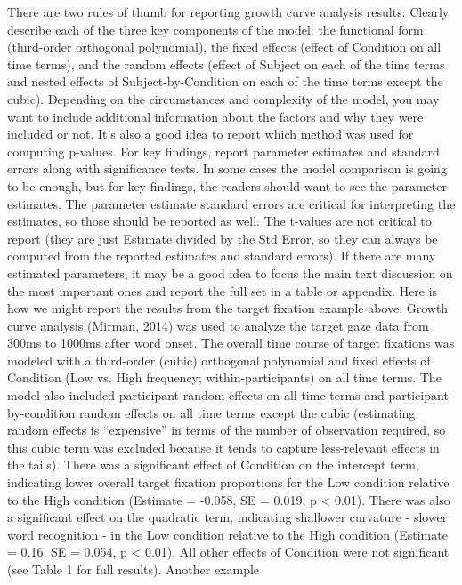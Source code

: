 There are two rules of thumb for reporting growth curve analysis results:
Clearly describe each of the three key components of the model: the functional form (third-order orthogonal polynomial), the fixed effects (effect of Condition on all time terms), and the random effects (effect of Subject on each of the time terms and nested effects of Subject-by-Condition on each of the time terms except the cubic). Depending on the circumstances and complexity of the model, you may want to include additional information about the factors and why they were included or not. It's also a good idea to report which method was used for computing p-values.
For key findings, report parameter estimates and standard errors along with significance tests. In some cases the model comparison is going to be enough, but for key findings, the readers should want to see the parameter estimates. The parameter estimate standard errors are critical for interpreting the estimates, so those should be reported as well. The t-values are not critical to report (they are just Estimate divided by the Std Error, so they can always be computed from the reported estimates and standard errors). If there are many estimated parameters, it may be a good idea to focus the main text discussion on the most important ones and report the full set in a table or appendix.
Here is how we might report the results from the target fixation example above:
Growth curve analysis (Mirman, 2014) was used to analyze the target gaze data from 300ms to 1000ms after word onset. The overall time course of target fixations was modeled with a third-order (cubic) orthogonal polynomial and fixed effects of Condition (Low vs. High frequency; within-participants) on all time terms. The model also included participant random effects on all time terms and participant-by-condition random effects on all time terms except the cubic (estimating random effects is “expensive” in terms of the number of observation required, so this cubic term was excluded because it tends to capture less-relevant effects in the tails). There was a significant effect of Condition on the intercept term, indicating lower overall target fixation proportions for the Low condition relative to the High condition (Estimate = -0.058, SE = 0.019, p < 0.01). There was also a significant effect on the quadratic term, indicating shallower curvature - slower word recognition - in the Low condition relative to the High condition (Estimate = 0.16, SE = 0.054, p < 0.01). All other effects of Condition were not significant (see Table 1 for full results).
Another example

